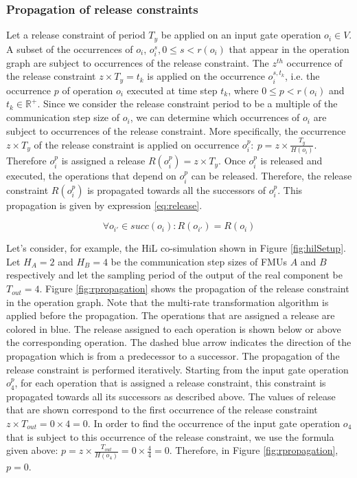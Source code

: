 \subsubsection{Propagation of release constraints}

Let a release constraint of period $T_y$ be applied on an input gate operation $o_i \in V$. A subset of the occurrences of $o_i$, $o^s_i, 0 \leq s < r(o_i)$ that appear in the operation graph are subject to occurrences of the release constraint. The $z^{th}$ occurrence of the release constraint $z \times T_y = t_k$ is applied on the occurrence $o^{s, t_k}_i $, i.e. the occurrence $p$ of operation $o_i$ executed at time step $t_k$, where $0 \leq p < r(o_i)$ and $t_k \in \mathbb{R}^+$. Since we consider the release constraint period to be a multiple of the communication step size of ${o_i}$, we can determine which occurrences of $o_i$ are subject to occurrences of the release constraint. More specifically, the occurrence $z \times T_y$ of the release constraint is applied on occurrence $o_i^p:\ p = z \times \frac{T_y}{H(o_i)}$. Therefore $o_i^p$ is assigned a release $R(o_i^p) = z \times T_y$. Once $o_i^p$ is released and executed, the operations that depend on $o_i^p$ can be released. Therefore, the release constraint $R(o_i^p)$ is propagated towards all the successors of $o_i^p$. This propagation is given by expression \ref{eq:release}.

\begin{equation}
\forall o_{i'} \in succ(o_i): R(o_{i'}) = R(o_i)
\label{eq:release}
\end{equation}

Let's consider, for example, the HiL co-simulation shown in Figure \ref{fig:hilSetup}. Let $H_A = 2$ and $H_B = 4$ be the communication step sizes of FMUs $A$ and $B$ respectively and let the sampling period of the output of the real component be $T_{out} = 4$. Figure \ref{fig:rpropagation} shows the propagation of the release constraint in the operation graph. Note that the multi-rate transformation algorithm is applied before the propagation. The operations that are assigned a release are colored in blue. The release assigned to each operation is shown below or above the corresponding operation. The dashed blue arrow indicates the direction of the propagation which is from a predecessor to a successor. The propagation of the release constraint is performed iteratively. Starting from the input gate operation $o_4^p$, for each operation that is assigned a release constraint, this constraint is propagated towards all its successors as described above. The values of release that are shown correspond to the first occurrence of the release constraint $z \times T_{out} = 0 \times 4 = 0$. In order to find the occurrence of the input gate operation $o_4$ that is subject to this occurrence of the release constraint, we use the formula given above: $p = z \times \frac{T_{out}}{H(o_4)} = 0 \times \frac{4}{4} = 0$. Therefore, in Figure \ref{fig:rpropagation}, $p = 0$.

